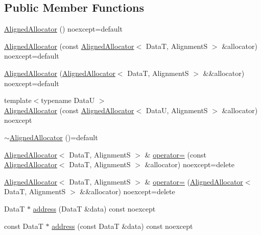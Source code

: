 \subsection*{Public Member Functions}
\begin{DoxyCompactItemize}
\item 
\hyperlink{structmage_1_1_aligned_allocator_a95363950f216346db818997988be73bf}{Aligned\+Allocator} () noexcept=default
\item 
\hyperlink{structmage_1_1_aligned_allocator_a57a8626271cc5bb8798201afb499dce7}{Aligned\+Allocator} (const \hyperlink{structmage_1_1_aligned_allocator}{Aligned\+Allocator}$<$ DataT, AlignmentS $>$ \&allocator) noexcept=default
\item 
\hyperlink{structmage_1_1_aligned_allocator_aa83ac0904d3354ed96a92f7ad713e1a7}{Aligned\+Allocator} (\hyperlink{structmage_1_1_aligned_allocator}{Aligned\+Allocator}$<$ DataT, AlignmentS $>$ \&\&allocator) noexcept=default
\item 
{\footnotesize template$<$typename DataU $>$ }\\\hyperlink{structmage_1_1_aligned_allocator_a728d237ac0ae50bcc593a94f6e4cd4fc}{Aligned\+Allocator} (const \hyperlink{structmage_1_1_aligned_allocator}{Aligned\+Allocator}$<$ DataU, AlignmentS $>$ \&allocator) noexcept
\item 
\hyperlink{structmage_1_1_aligned_allocator_a98bda5c375a177eaa71cd622622451eb}{$\sim$\+Aligned\+Allocator} ()=default
\item 
\hyperlink{structmage_1_1_aligned_allocator}{Aligned\+Allocator}$<$ DataT, AlignmentS $>$ \& \hyperlink{structmage_1_1_aligned_allocator_ae30b9ecaee6492dc7828e693953d6080}{operator=} (const \hyperlink{structmage_1_1_aligned_allocator}{Aligned\+Allocator}$<$ DataT, AlignmentS $>$ \&allocator) noexcept=delete
\item 
\hyperlink{structmage_1_1_aligned_allocator}{Aligned\+Allocator}$<$ DataT, AlignmentS $>$ \& \hyperlink{structmage_1_1_aligned_allocator_a968996d679acfd7ce9d113bf33d31c91}{operator=} (\hyperlink{structmage_1_1_aligned_allocator}{Aligned\+Allocator}$<$ DataT, AlignmentS $>$ \&\&allocator) noexcept=delete
\item 
DataT $\ast$ \hyperlink{structmage_1_1_aligned_allocator_a8c7fc099279194e37afa8e4dae1a64fa}{address} (DataT \&data) const noexcept
\item 
const DataT $\ast$ \hyperlink{structmage_1_1_aligned_allocator_afd76c25aa8f6918172c8e0ac8146963a}{address} (const DataT \&data) const noexcept
\item 

\end{DoxyCompactItemize}
